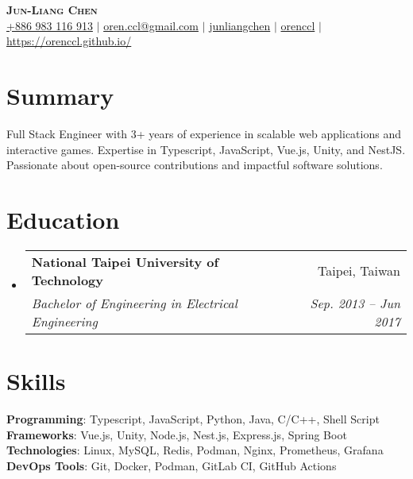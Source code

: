 \documentclass[letterpaper,11pt]{article}
\makeatletter
\newcommand{\resumeSubheading}[4]{
  \vspace{-2pt}\item
    \begin{tabular*}{0.97\textwidth}[t]{l@{\extracolsep{\fill}}r}
      \textbf{#1} & #2 \\
      \textit{\small#3} & \textit{\small #4} \\
    \end{tabular*}\vspace{-3pt}
}
\newcommand{\resumeSubHeadingListStart}{\begin{itemize}[leftmargin=0.15in, label={}]}
\newcommand{\resumeSubHeadingListEnd}{\end{itemize}}
\makeatother
\begin{document}

\begin{center}
    \textbf{\Huge \scshape Jun-Liang Chen} \\ \vspace{1pt}
     \href{tel:886983116913}{{+886 983 116 913}} $|$
     \href{mailto:oren.ccl@gmail.com}{{oren.ccl@gmail.com}} $|$
     \href{https://www.linkedin.com/in/jun-liang-chen-6a7743188/}{{junliangchen}} $|$
     \href{https://github.com/orenccl}{{orenccl}} $|$
     \href{https://orenccl.github.io/}{{https://orenccl.github.io/}}
\end{center}

\section{Summary}
\small{Full Stack Engineer with 3+ years of experience in scalable web applications and interactive games. Expertise in Typescript, JavaScript, Vue.js, Unity, and NestJS. Passionate about open-source contributions and impactful software solutions.}

\section{Education}
  \resumeSubHeadingListStart
    \resumeSubheading
      {National Taipei University of Technology}{Taipei, Taiwan}
      {Bachelor of Engineering in Electrical Engineering}{Sep. 2013 -- Jun 2017}
  \resumeSubHeadingListEnd

\section{Skills}
 \begin{itemize}[leftmargin=0.15in, label={}]
    \small{\item{
     \textbf{Programming}{: Typescript, JavaScript, Python, Java, C/C++, Shell Script} \\
     \textbf{Frameworks}{: Vue.js, Unity, Node.js, Nest.js, Express.js, Spring Boot} \\
     \textbf{Technologies}{: Linux, MySQL, Redis, Podman, Nginx, Prometheus, Grafana} \\
      \textbf{DevOps Tools}{: Git, Docker, Podman, GitLab CI, GitHub Actions} \\
    }}
 \end{itemize}
\end{document}

